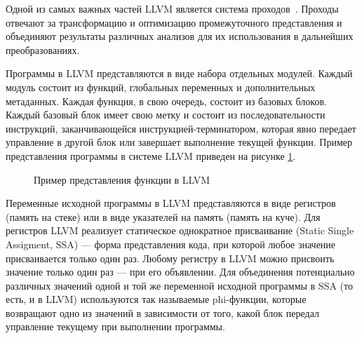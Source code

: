 Одной из самых важных частей LLVM является система проходов~\cite{llvmpass}. 
Проходы отвечают за трансформацию и оптимизацию промежуточного представления и 
объединяют результаты различных анализов для их использования в дальнейших 
преобразованиях.

Программы в LLVM представляются в виде набора отдельных модулей. Каждый модуль 
состоит из функций, глобальных переменных и дополнительных метаданных. Каждая 
функция, в свою очередь, состоит из базовых блоков. Каждый базовый блок имеет 
свою метку и состоит из последовательности инструкций, заканчивающейся 
инструкцией-терминатором, которая явно передает управление в другой блок или 
завершает выполнение текущей функции. Пример представления программы в системе 
LLVM приведен на рисунке \ref{image:llvmIR}.
\begin{figure}[h!]
\caption{Пример представления функции в LLVM}
\label{image:llvmIR}
\end{figure}
    
Переменные исходной программы в LLVM представляются в виде регистров (память
на стеке) или в виде указателей на память (память на куче). Для регистров 
LLVM реализует статическое однократное присваивание (Static Single Assigment, 
SSA) --- форма представления кода, при которой любое значение присваивается 
только один раз. Любому регистру в LLVM можно присвоить значение только один 
раз --- при его объявлении. Для объединения потенциально различных значений 
одной и той же переменной исходной программы в SSA (то есть, и в LLVM) 
используются так называемые phi-функции, которые возвращают одно из значений в 
зависимости от того, какой блок передал управление текущему при выполнении 
программы.

